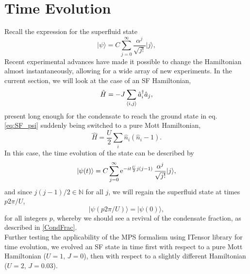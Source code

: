 \section{Time Evolution}
Recall the expression for the superfluid state
\begin{equation}\label{eq:SF_psi}
\lvert \psi \rangle = C \sum_{j=0}^{\infty} \frac{\alpha^j}{\sqrt{j!}}\lvert j\rangle,
\end{equation}
Recent experimental advances have made it possible to change the Hamiltonian almost instantaneously, allowing for a wide array of new experiments. In the current section, we will look at the case of an SF Hamiltonian,
\begin{equation}\label{eq:SF_ham}
\hat{H} = -J \sum_{\braket{i,j}} \hat{a}_{i}^{\dag} \hat{a}_j,
\end{equation}
 present long enough for the condensate to reach the ground state in eq. \ref{eq:SF_psi} suddenly being switched to a pure Mott Hamiltonian,
\begin{equation}
 \hat{H} = \frac{U}{2} \sum_{i} \hat{n}_i \left( \hat{n}_i -1 \right).
\end{equation}
%
In this case, the time evolution of the state can be described by
\begin{equation}
\lvert \psi (t) \rangle = C \sum_{j=0}^{\infty} \operatorname{e}^{-it \frac{U}{2} j(j-1)}\frac{\alpha^j}{\sqrt{j!}}\lvert j\rangle,
\end{equation}
and since $j(j-1)/2\in \mathbb{N}$ for all $j$, we will regain the superfluid state at times $p2\pi/U$,
\begin{equation}
\lvert \psi (p2\pi/U) \rangle = \lvert \psi (0) \rangle,
\end{equation}
for all integers $p$, whereby we should see a revival of the condensate fraction, as described in \ref{CondFrac}.\\

Further testing the applicability of the MPS formalism using ITensor library for time evolution, we evolved an SF state in time first with respect to a pure Mott Hamiltonian ($U=1$, $J=0$), then with respect to a slightly different Hamiltonian ($U=2$, $J=0.03$).

